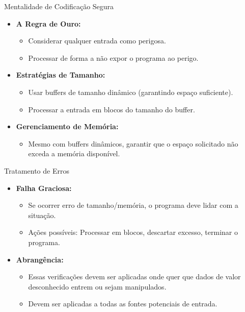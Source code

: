 \begin{frame}{Mentalidade de Codificação Segura}
    \begin{itemize}
        \item \textbf{A Regra de Ouro:}
              \begin{itemize}
                  \item Considerar qualquer entrada como perigosa.
                  \item Processar de forma a não expor o programa ao perigo.
              \end{itemize}

        \item \textbf{Estratégias de Tamanho:}
              \begin{itemize}
                  \item Usar buffers de tamanho dinâmico (garantindo espaço suficiente).
                  \item Processar a entrada em blocos do tamanho do buffer.
              \end{itemize}

        \item \textbf{Gerenciamento de Memória:}
              \begin{itemize}
                  \item Mesmo com buffers dinâmicos, garantir que o espaço solicitado não exceda a memória disponível.
              \end{itemize}
    \end{itemize}
\end{frame}

\begin{frame}{Tratamento de Erros}
    \begin{itemize}
        \item \textbf{Falha Graciosa:}
              \begin{itemize}
                  \item Se ocorrer erro de tamanho/memória, o programa deve lidar com a situação.
                  \item Ações possíveis: Processar em blocos, descartar excesso, terminar o programa.
              \end{itemize}

        \item \textbf{Abrangência:}
              \begin{itemize}
                  \item Essas verificações devem ser aplicadas onde quer que dados de valor desconhecido entrem ou sejam manipulados.
                  \item Devem ser aplicadas a todas as fontes potenciais de entrada.
              \end{itemize}
    \end{itemize}
\end{frame}

